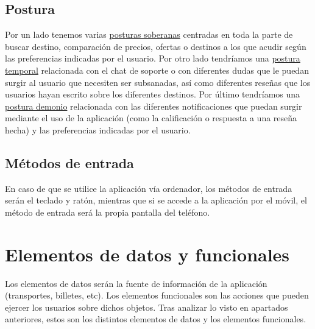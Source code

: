 \subsection{Postura}
Por un lado tenemos varias \underline{posturas soberanas} centradas en toda la parte de buscar destino, comparación de precios, ofertas o destinos a los que acudir 
según las preferencias indicadas por el usuario. Por otro lado tendríamos una \underline{postura temporal} relacionada con el chat de soporte o con diferentes dudas 
que le puedan surgir al usuario que necesiten ser subsanadas, así como diferentes reseñas que los usuarios hayan escrito sobre los diferentes destinos. Por último 
tendríamos una \underline{postura demonio} relacionada con las diferentes notificaciones que puedan surgir mediante el uso de la aplicación (como la calificación o 
respuesta a una reseña hecha) y las preferencias indicadas por el usuario.

\subsection{Métodos de entrada}
En caso de que se utilice la aplicación vía ordenador, los métodos de entrada serán el teclado y ratón, mientras que si se accede a la aplicación por el móvil, 
el método de entrada será la propia pantalla del teléfono.

\section{Elementos de datos y funcionales}

Los elementos de datos serán la fuente de información de la aplicación (transportes, billetes, etc). Los elementos funcionales son las acciones que pueden ejercer los usuarios sobre dichos objetos. Tras analizar lo visto en apartados anteriores, estos son los distintos elementos de datos y los elementos funcionales.

